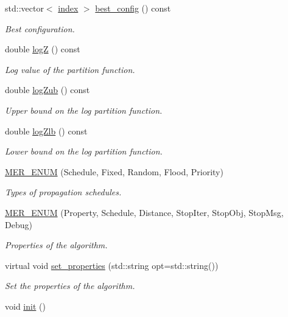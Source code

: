\begin{DoxyCompactItemize}
std\+::vector$<$ \hyperlink{classmerlin_1_1graph_a5cade38832f47248573e921276f122d6}{index} $>$ \hyperlink{classmerlin_1_1lbp_a7511d2d8fe99649f85a5c8ae88a8a379}{best\+\_\+config} () const 
\begin{DoxyCompactList}\small\item\em Best configuration. \end{DoxyCompactList}\item 
double \hyperlink{classmerlin_1_1lbp_a5f0f0d6b2605e1b3f47b6de9875d5590}{logZ} () const 
\begin{DoxyCompactList}\small\item\em Log value of the partition function. \end{DoxyCompactList}\item 
double \hyperlink{classmerlin_1_1lbp_a0451118b6fa2c1017512879e025afd4d}{log\+Zub} () const 
\begin{DoxyCompactList}\small\item\em Upper bound on the log partition function. \end{DoxyCompactList}\item 
double \hyperlink{classmerlin_1_1lbp_ada4dd7a71b8ac11ad419f3f7b1b6d658}{log\+Zlb} () const 
\begin{DoxyCompactList}\small\item\em Lower bound on the log partition function. \end{DoxyCompactList}\item 
\hyperlink{classmerlin_1_1lbp_ab4dc295e5265a3a2e259dc979ba35b91}{M\+E\+R\+\_\+\+E\+N\+UM} (Schedule, Fixed, Random, Flood, Priority)\hypertarget{classmerlin_1_1lbp_ab4dc295e5265a3a2e259dc979ba35b91}{}\label{classmerlin_1_1lbp_ab4dc295e5265a3a2e259dc979ba35b91}

\begin{DoxyCompactList}\small\item\em Types of propagation schedules. \end{DoxyCompactList}\item 
\hyperlink{classmerlin_1_1lbp_ad8d39f5967a07d53b7c27459a961bf66}{M\+E\+R\+\_\+\+E\+N\+UM} (Property, Schedule, Distance, Stop\+Iter, Stop\+Obj, Stop\+Msg, Debug)\hypertarget{classmerlin_1_1lbp_ad8d39f5967a07d53b7c27459a961bf66}{}\label{classmerlin_1_1lbp_ad8d39f5967a07d53b7c27459a961bf66}

\begin{DoxyCompactList}\small\item\em Properties of the algorithm. \end{DoxyCompactList}\item 
virtual void \hyperlink{classmerlin_1_1lbp_a2feb90924b5d7bf82a40bf93912041d0}{set\+\_\+properties} (std\+::string opt=std\+::string())
\begin{DoxyCompactList}\small\item\em Set the properties of the algorithm. \end{DoxyCompactList}\item 
void \hyperlink{classmerlin_1_1lbp_a61e6c00e8236acc65b59194e09180692}{init} ()\hypertarget{classmerlin_1_1lbp_a61e6c00e8236acc65b59194e09180692}{}\label{classmerlin_1_1lbp_a61e6c00e8236acc65b59194e09180692}


\end{DoxyCompactItemize}
